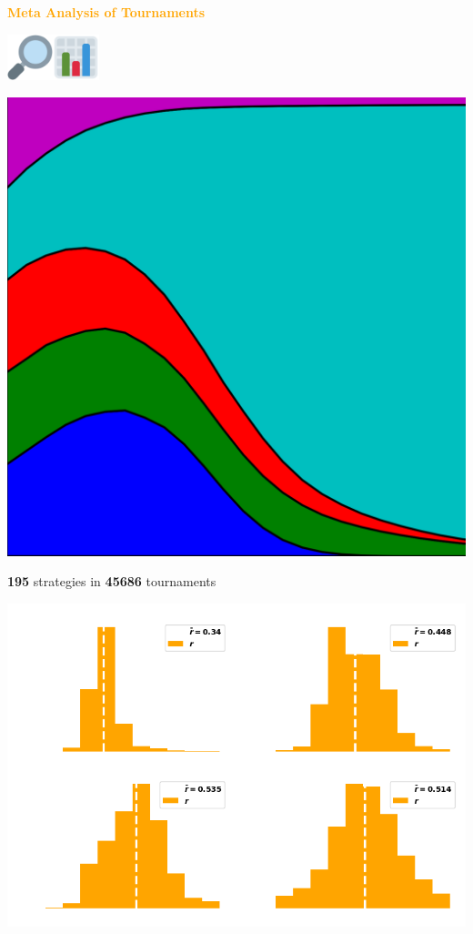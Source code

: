 \documentclass{beamer}
\begin{document}
\begin{frame}
    \begin{center}
    \textcolor{orange}{\large{\textbf{Meta Analysis of Tournaments}}} \vspace{1cm}

    \includegraphics[width=0.10\textwidth]{static/look.png}\hspace{2pt}\includegraphics[width=0.10\textwidth]{static/bar.png}
    \end{center}
\end{frame}

\begin{frame}
    \begin{center}
        \includegraphics[width=.25\textwidth]{static/axelrod-logo.png}
    \end{center}
\end{frame}

\begin{frame}
    \begin{center}
    \Large{\textbf{195}} \small{strategies in} \Large{\textbf{45686}} \small{tournaments}
    \end{center}
\end{frame}

\begin{frame}
    \begin{center}
        \includegraphics[width=\textwidth]{static/tit_for_tat_r_distributions.png}
    \end{center}
\end{frame}
\end{document}

